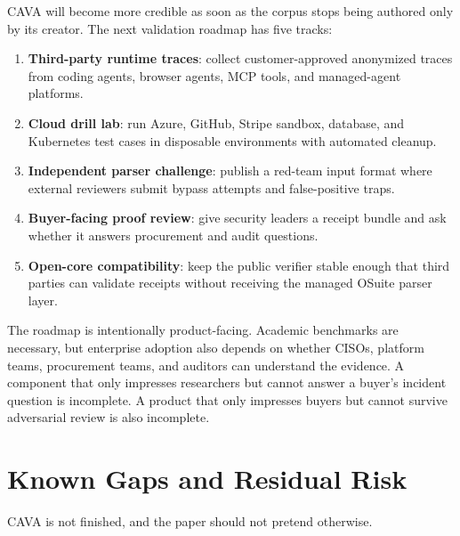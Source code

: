 \documentclass[11pt]{article}
\begin{document}
CAVA will become more credible as soon as the corpus stops being authored only by its creator. The next validation roadmap has five tracks:

\begin{enumerate}
  \item \textbf{Third-party runtime traces}: collect customer-approved anonymized traces from coding agents, browser agents, MCP tools, and managed-agent platforms.
  \item \textbf{Cloud drill lab}: run Azure, GitHub, Stripe sandbox, database, and Kubernetes test cases in disposable environments with automated cleanup.
  \item \textbf{Independent parser challenge}: publish a red-team input format where external reviewers submit bypass attempts and false-positive traps.
  \item \textbf{Buyer-facing proof review}: give security leaders a receipt bundle and ask whether it answers procurement and audit questions.
  \item \textbf{Open-core compatibility}: keep the public verifier stable enough that third parties can validate receipts without receiving the managed OSuite parser layer.
\end{enumerate}

The roadmap is intentionally product-facing. Academic benchmarks are necessary, but enterprise adoption also depends on whether CISOs, platform teams, procurement teams, and auditors can understand the evidence. A component that only impresses researchers but cannot answer a buyer's incident question is incomplete. A product that only impresses buyers but cannot survive adversarial review is also incomplete.

\section{Known Gaps and Residual Risk}

CAVA is not finished, and the paper should not pretend otherwise.
\end{document}
